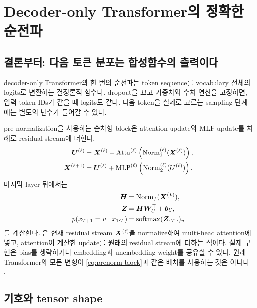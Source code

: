 \chapter{Decoder-only Transformer의 정확한 순전파}
\label{chap:phase2}

\section{결론부터: 다음 토큰 분포는 합성함수의 출력이다}

decoder-only Transformer의 한 번의 순전파는 token sequence를 vocabulary 전체의 logits로 변환하는 결정론적 함수다.
dropout을 끄고 가중치와 수치 연산을 고정하면, 입력 token IDs가 같을 때 logits도 같다.
다음 token을 실제로 고르는 sampling 단계에는 별도의 난수가 들어갈 수 있다.

pre-normalization을 사용하는 순차형 block은 attention update와 MLP update를 차례로 residual stream에 더한다.
\begin{align}
  \bm{U}^{(\ell)}
    &=\bm{X}^{(\ell)}+\operatorname{Attn}^{(\ell)}
       \left(\operatorname{Norm}^{(\ell)}_1(\bm{X}^{(\ell)})\right),
       \label{eq:attention-residual-update} \\
  \bm{X}^{(\ell+1)}
    &=\bm{U}^{(\ell)}+\operatorname{MLP}^{(\ell)}
       \left(\operatorname{Norm}^{(\ell)}_2(\bm{U}^{(\ell)})\right).
  \label{eq:prenorm-block}
\end{align}
마지막 layer 뒤에서는
\begin{align}
  \bm{H}&=\operatorname{Norm}_{f}(\bm{X}^{(L)}),\\
  \bm{Z}&=\bm{H}\bm{W}_{U}^{\mathsf T}+\bm{b}_{U},\\
  p(x_{T+1}=v\mid x_{1:T})&=\operatorname{softmax}(\bm{Z}_{:,T,:})_v
\end{align}
를 계산한다.
은 현재 residual stream $\bm{X}^{(\ell)}$을 normalize하여 multi-head attention에 넣고, attention이 계산한 update를 원래의 residual stream에 더하는 식이다.
실제 구현은 bias를 생략하거나 embedding과 unembedding weight를 공유할 수 있다.
원래 Transformer의 모든 변형이 \cref{eq:prenorm-block}과 같은 배치를 사용하는 것은 아니다 \citep{vaswani2017attention,xiong2020layernorm}.

\section{기호와 tensor shape}

